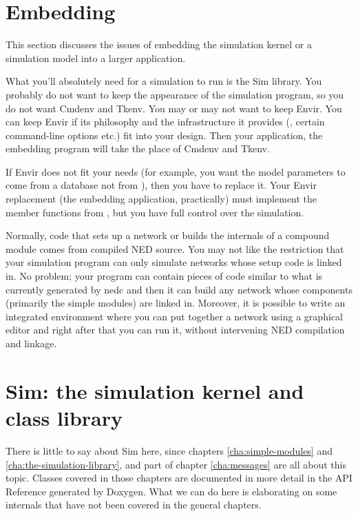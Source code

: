\section{Embedding {\opp}}
\label{sec:ch-opp-design:embedding}

This section discusses the issues of embedding the simulation kernel
or a simulation model into a larger application.

What you'll absolutely need for a simulation to run is the Sim library. You
probably do not want to keep the appearance of the simulation program, so
you do not want Cmdenv and Tkenv. You may or may not want to keep Envir.
You can keep Envir if its philosophy and the infrastructure it provides
(, certain command-line options etc.) fit into your
design. Then your application, the embedding program will take the place of
Cmdenv and Tkenv.

If Envir does not fit your needs (for example, you want the model
parameters to come from a database not from ), then you
have to replace it. Your Envir replacement (the embedding application,
practically) must implement the  member functions from
, but you have full control over the simulation.

Normally, code that sets up a network or builds the internals of a
compound module comes from compiled NED source.  You may not like the
restriction that your simulation program can only simulate networks
whose setup code is linked in. No problem; your program can contain
pieces of code similar to what is currently generated by nedc and then it can build
any network whose components (primarily the simple modules) are linked
in. Moreover, it is possible to write an integrated environment where
you can put together a network using a graphical editor and right
after that you can run it, without intervening NED compilation and
linkage.





\section{Sim: the simulation kernel and class library}

There is little to say about Sim here, since chapters
\ref{cha:simple-modules} and \ref{cha:the-simulation-library},
and part of chapter \ref{cha:messages} are all about
this topic. Classes covered in those chapters are documented
in more detail in the API Reference generated by Doxygen.
What we can do here is elaborating on some internals
that have not been covered in the general chapters.

